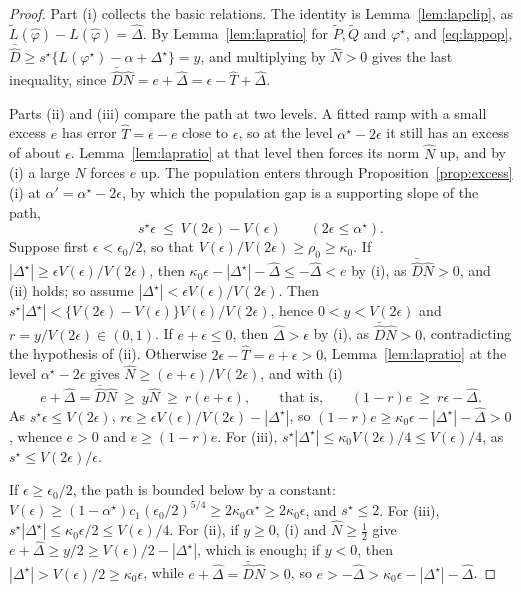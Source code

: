 \begin{proof}
Part (i) collects the basic relations. The identity is Lemma~\ref{lem:lapclip}, as
$\tilde L(\widehat\varphi)-L(\widehat\varphi)=\widehat\Delta$. By Lemma~\ref{lem:lapratio} for $\tilde P,\tilde Q$ and
$\varphi^\star$, and \eqref{eq:lappop}, $\bar{\widehat D}\ge s^\star\{L(\varphi^\star)-\alpha+\Delta^\star\}=y$, and
multiplying by $\widehat N>0$ gives the last inequality, since $\bar{\widehat D}\widehat N=e+\widehat\Delta=\epsilon-\widehat
T+\widehat\Delta$.

Parts (ii) and (iii) compare the path at two levels. A fitted ramp with a small excess $e$ has error
$\widehat T=\epsilon-e$ close to $\epsilon$, so at the level $\alpha^\star-2\epsilon$ it still has an excess of about
$\epsilon$. Lemma~\ref{lem:lapratio} at that level then forces its norm $\widehat N$ up, and by (i) a large $\widehat N$
forces $e$ up. The population enters through Proposition~\ref{prop:excess}(i) at $\alpha'=\alpha^\star-2\epsilon$, by
which the population gap is a supporting slope of the path,
\[
s^\star\epsilon\ \le\ V(2\epsilon)-V(\epsilon)\qquad(2\epsilon\le\alpha^\star).
\]
Suppose first $\epsilon<\epsilon_0/2$, so that $V(\epsilon)/V(2\epsilon)\ge\rho_0\ge\kappa_0$.
If $|\Delta^\star|\ge\epsilon V(\epsilon)/V(2\epsilon)$, then $\kappa_0\epsilon-|\Delta^\star|-\widehat\Delta\le-\widehat\Delta<e$
by (i), as $\bar{\widehat D}\widehat N>0$, and (ii) holds; so assume $|\Delta^\star|<\epsilon V(\epsilon)/V(2\epsilon)$. Then
$s^\star|\Delta^\star|<\{V(2\epsilon)-V(\epsilon)\}V(\epsilon)/V(2\epsilon)$, hence $0<y<V(2\epsilon)$ and
$r=y/V(2\epsilon)\in(0,1)$. If $e+\epsilon\le0$, then $\widehat\Delta>\epsilon$ by (i), as $\bar{\widehat D}\widehat N>0$,
contradicting the hypothesis of (ii). Otherwise $2\epsilon-\widehat T=e+\epsilon>0$, Lemma~\ref{lem:lapratio} at the
level $\alpha^\star-2\epsilon$ gives $\widehat N\ge(e+\epsilon)/V(2\epsilon)$, and with (i)
\[
e+\widehat\Delta=\bar{\widehat D}\widehat N\ \ge\ y\widehat N\ \ge\ r(e+\epsilon),
\qquad\text{that is,}\qquad(1-r)e\ \ge\ r\epsilon-\widehat\Delta .
\]
As $s^\star\epsilon\le V(2\epsilon)$, $r\epsilon\ge\epsilon V(\epsilon)/V(2\epsilon)-|\Delta^\star|$, so
$(1-r)e\ge\kappa_0\epsilon-|\Delta^\star|-\widehat\Delta>0$, whence $e>0$ and $e\ge(1-r)e$. For (iii),
$s^\star|\Delta^\star|\le\kappa_0V(2\epsilon)/4\le V(\epsilon)/4$, as $s^\star\le V(2\epsilon)/\epsilon$.

If $\epsilon\ge\epsilon_0/2$, the path is bounded below by a constant: $V(\epsilon)\ge(1-\alpha^\star)c_1(\epsilon_0/2)^{5/4}\ge
2\kappa_0\alpha^\star\ge2\kappa_0\epsilon$, and $s^\star\le2$. For (iii), $s^\star|\Delta^\star|\le\kappa_0\epsilon/2\le
V(\epsilon)/4$. For (ii), if $y\ge0$, (i) and $\widehat N\ge\tfrac12$ give $e+\widehat\Delta\ge y/2\ge
V(\epsilon)/2-|\Delta^\star|$, which is enough; if $y<0$, then $|\Delta^\star|>V(\epsilon)/2\ge\kappa_0\epsilon$, while
$e+\widehat\Delta=\bar{\widehat D}\widehat N>0$, so $e>-\widehat\Delta>\kappa_0\epsilon-|\Delta^\star|-\widehat\Delta$.
\end{proof}

